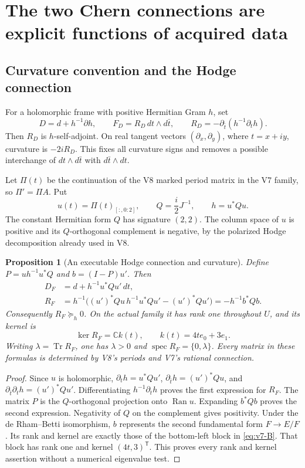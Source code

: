 \documentclass[11pt]{article}
\newtheorem{proposition}[proposition]{Proposition}
\theoremstyle{definition}
\theoremstyle{remark}
\newcommand{\C}{\mathbb C}
\newcommand{\Tr}{\operatorname{Tr}}
\newcommand{\spec}{\operatorname{spec}}
\begin{document}
\section{The two Chern connections are explicit functions of acquired data}
\label{sec:v9-Chern}

\subsection{Curvature convention and the Hodge connection}
For a holomorphic frame with positive Hermitian Gram $h$, set
\begin{equation}
 D=d+h^{-1}\partial h,\qquad
 F_D=R_D\,dt\wedge d\bar t,\qquad
 R_D=-\partial_{\bar t}(h^{-1}\partial_t h).
 \label{eq:v9-curv-convention}
\end{equation}
Then $R_D$ is $h$-self-adjoint. On real tangent vectors
$(\partial_x,\partial_y)$, where $t=x+iy$, curvature is $-2iR_D$.
This fixes all curvature signs and removes a possible interchange of
$dt\wedge d\bar t$ with $d\bar t\wedge dt$.

Let $\Pi(t)$ be the continuation of the V8 marked period matrix in the V7
family, so $\Pi'=\Pi A$. Put
\[
 u(t)=\Pi(t)_{[:,0:2]},\qquad Q=\frac i2J^{-1},\qquad h=u^*Qu.
\]
The constant Hermitian form $Q$ has signature $(2,2)$. The column space of
$u$ is positive and its $Q$-orthogonal complement is negative, by the
polarized Hodge decomposition already used in V8.

\begin{proposition}[An executable Hodge connection and curvature]
\label{prop:v9-Hodge-curvature}
Define $P=u h^{-1}u^*Q$ and $b=(I-P)u'$. Then
\begin{align}
 D_F&=d+h^{-1}u^*Qu'\,dt,\\
 R_F&=h^{-1}\bigl((u')^*Qu\,h^{-1}u^*Qu'-(u')^*Qu'\bigr)
     =-h^{-1}b^*Qb. \label{eq:v9-Hodge-R}
\end{align}
Consequently $R_F\succeq_h0$. On the actual family it has rank one
throughout $U$, and its kernel is
\begin{equation}
 \boxed{\ker R_F=\C k(t),\qquad k(t)=4t e_0+3e_1.}
 \label{eq:v9-kernel}
\end{equation}
Writing $\lambda=\Tr R_F$, one has $\lambda>0$ and
$\spec R_F=\{0,\lambda\}$. Every matrix in these formulas is determined by
V8's periods and V7's rational connection.
\end{proposition}
\begin{proof}
Since $u$ is holomorphic, $\partial_t h=u^*Qu'$,
$\partial_{\bar t}h=(u')^*Qu$, and
$\partial_{\bar t}\partial_t h=(u')^*Qu'$. Differentiating
$h^{-1}\partial_t h$ proves the first expression for $R_F$.
The matrix $P$ is the $Q$-orthogonal projection onto $\operatorname{Ran}u$.
Expanding $b^*Qb$ proves the second expression. Negativity of $Q$ on the
complement gives positivity. Under the de Rham--Betti isomorphism, $b$
represents the second fundamental form $F\to E/F$. Its rank and kernel
are exactly those of the bottom-left block in \cref{eq:v7-B}. That block
has rank one and kernel $(4t,3)^{\mathsf T}$. This proves every rank and
kernel assertion without a numerical eigenvalue test.
\end{proof}
\end{document}
